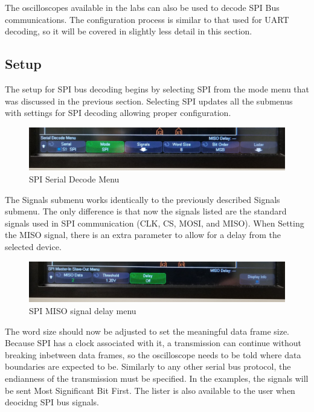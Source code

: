 \documentclass{article}
\begin{document}
  The oscilloscopes available in the labs can also be used to decode SPI Bus
  communications. The configuration process is similar to that used for UART
  decoding, so it will be covered in slightly less detail in this section.

  \subsection{Setup}

  The setup for SPI bus decoding begins by selecting SPI from the mode menu that
  was discussed in the previous section. Selecting SPI updates all the submenus
  with settings for SPI decoding allowing proper configuration.

  \begin{figure}[h]
    \includegraphics[width=\textwidth]{images/spi/spi_serial_menu.jpg}
    \caption{SPI Serial Decode Menu}
  \end{figure}

  The Signals submenu works identically to the previously described Signals
  submenu. The only difference is that now the signals listed are the standard
  signals used in SPI communication (CLK, CS, MOSI, and MISO). When Setting the
  MISO signal, there is an extra parameter to allow for a delay from the
  selected device.

  \begin{figure}[h]
    \includegraphics[width=\textwidth]{images/spi/spi_slave_delay.jpg}
    \caption{SPI MISO signal delay menu}
  \end{figure}

  The word size should now be adjusted to set the meaningful data frame size.
  Because SPI has a clock associated with it, a transmission can continue
  without breaking inbetween data frames, so the oscilloscope needs to be told
  where data boundaries are expected to be.
  Similarly to any other serial bus protocol, the endianness of the transmission
  must be specified. In the examples, the signals will be sent Most Significant
  Bit First.
  The lister is also available to the user when deocidng SPI bus signals.
\end{document}
